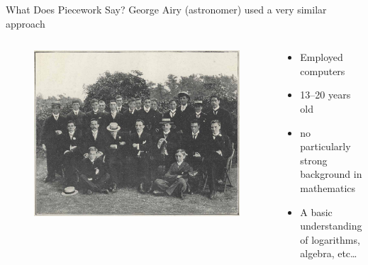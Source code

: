 \documentclass[presentation]{subfiles}
\begin{document}
\begin{frame}{What Does Piecework Say?}
      George Airy (astronomer) used a very similar approach\\
      \scriptsize{\textcite{grier2013computers}}\normalsize{}
    \begin{columns}
    \begin{column}{0.6\textwidth}
      \begin{figure}
        \includegraphics[width=\textwidth]{figures/photo/Greenwich-Observatory-computing-staff-1902.jpg}
      \end{figure}
    \end{column}
    
    \begin{column}{0.4\textwidth}
      \begin{itemize}
        \item Employed computers
        \item 13--20 years old
        \item no particularly strong background in mathematics
        \item A basic understanding of logarithms, algebra, etc\dots
      \end{itemize}
    \end{column}
    \end{columns}

\end{frame}
\end{document}
